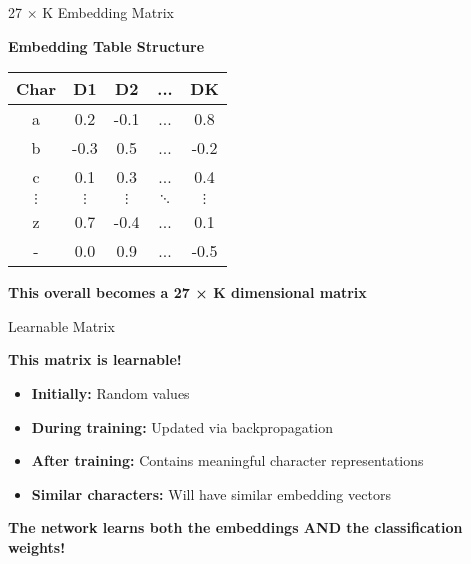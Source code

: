 \documentclass[usenames,dvipsnames]{beamer}
\begin{document}
\begin{frame}{27 × K Embedding Matrix}
\begin{center}
\textbf{Embedding Table Structure}
\end{center}

\vspace{0.3cm}
\begin{center}
\begin{tabular}{|c|c|c|c|c|}
\hline
\textbf{Char} & \textbf{D1} & \textbf{D2} & \textbf{...} & \textbf{DK} \\
\hline
a & 0.2 & -0.1 & ... & 0.8 \\
b & -0.3 & 0.5 & ... & -0.2 \\
c & 0.1 & 0.3 & ... & 0.4 \\
$\vdots$ & $\vdots$ & $\vdots$ & $\ddots$ & $\vdots$ \\
z & 0.7 & -0.4 & ... & 0.1 \\
- & 0.0 & 0.9 & ... & -0.5 \\
\hline
\end{tabular}
\end{center}

\vspace{0.5cm}
\begin{center}
\textbf{This overall becomes a 27 × K dimensional matrix}
\end{center}
\end{frame}

\begin{frame}{Learnable Matrix}
\begin{center}
\textbf{This matrix is learnable!}
\end{center}

\vspace{1cm}
\begin{itemize}
\item \textbf{Initially:} Random values
\pause
\item \textbf{During training:} Updated via backpropagation
\pause
\item \textbf{After training:} Contains meaningful character representations
\pause
\item \textbf{Similar characters:} Will have similar embedding vectors
\end{itemize}

\vspace{1cm}
\begin{center}
\textbf{The network learns both the embeddings AND the classification weights!}
\end{center}
\end{frame}
\end{document}
